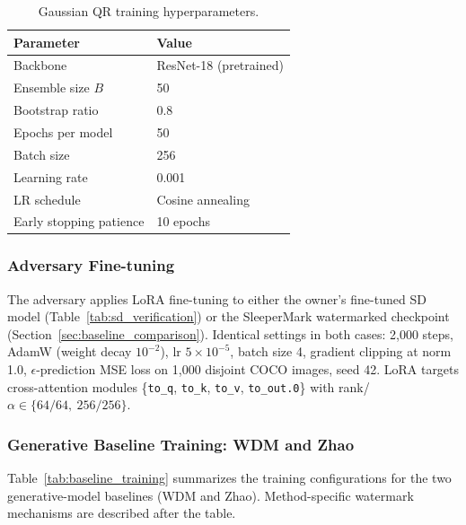 \documentclass{article}
\begin{document}
\begin{table}[!htbp]
\caption{Gaussian QR training hyperparameters.}
\centering
\begin{tabular}{ll}
\toprule
Parameter & Value \\
\midrule
Backbone & ResNet-18 (pretrained) \\
Ensemble size $B$ & 50 \\
Bootstrap ratio & 0.8 \\
Epochs per model & 50 \\
Batch size & 256 \\
Learning rate & 0.001 \\
LR schedule & Cosine annealing \\
Early stopping patience & 10 epochs \\
\bottomrule
\end{tabular}
\end{table}

\subsubsection{Adversary Fine-tuning}

The adversary applies LoRA fine-tuning to either the owner's fine-tuned SD model (Table~\ref{tab:sd_verification}) or the SleeperMark watermarked checkpoint (Section~\ref{sec:baseline_comparison}). Identical settings in both cases: 2{,}000 steps, AdamW (weight decay $10^{-2}$), lr $5{\times}10^{-5}$, batch size 4, gradient clipping at norm 1.0, $\epsilon$-prediction MSE loss on 1{,}000 disjoint COCO images, seed 42. LoRA targets cross-attention modules \{\texttt{to\_q}, \texttt{to\_k}, \texttt{to\_v}, \texttt{to\_out.0}\} with rank/$\alpha \in \{64/64,\ 256/256\}$.

\subsubsection{Generative Baseline Training: WDM and Zhao}

Table~\ref{tab:baseline_training} summarizes the training configurations for the two generative-model baselines (WDM and Zhao). Method-specific watermark mechanisms are described after the table.
\end{document}
